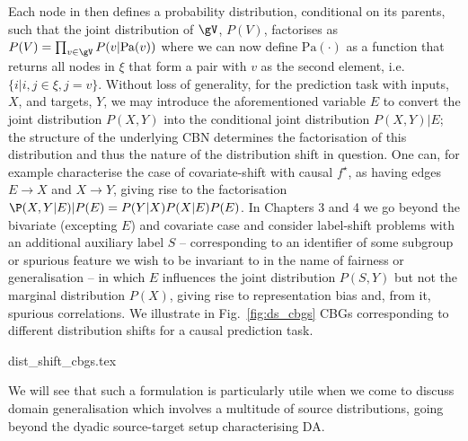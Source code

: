 %
Each node in \rmG then defines a probability distribution, conditional on its parents, such that
the joint distribution of \(\gV\), \(P(V)\), factorises as \( P(V) = \prod_{v \in \gV} P(v |
\text{Pa}(v)) \) where we can now define \(\text{Pa}(\cdot)\) as a function that returns all nodes
in \(\xi\) that form a pair with \(v\) as the second element, i.e. \( \{ i | i,j \in \xi, j = v \}
\).
%
Without loss of generality, for the prediction task with inputs, \(X\), and targets, \(Y\), we may
introduce the aforementioned variable \(E\) to convert the joint distribution \(P(X, Y)\) into the
conditional joint distribution \( P(X, Y) | E \); the structure of the underlying CBN determines
the factorisation of this distribution and thus the nature of the distribution shift in question.
%
One can, for example characterise the case of covariate-shift with causal \(f^\star\), as having
edges  \(E \to X\) and \( X \to Y \), giving rise to the factorisation \( \P(X, Y | E) | P(E) =
P(Y|X)P(X|E)P(E) \). 
%
In Chapters 3 and 4 we go beyond the bivariate (excepting \( E \)) and covariate case and consider
label-shift problems with an additional auxiliary label \(S\) -- corresponding to an identifier of
some subgroup or spurious feature we wish to be invariant to in the name of fairness or
generalisation --  in which \(E\) influences the joint distribution \( P(S, Y) \) but not the
marginal distribution \(P(X)\), giving rise to representation bias and, from it, spurious
correlations.
%
We illustrate in Fig.~\ref{fig:ds_cbgs} CBGs corresponding to different distribution shifts for a
causal prediction task.
%

{dist_shift_cbgs.tex}

%
We will see that such a formulation is particularly utile when we come to discuss domain
generalisation which involves a multitude of source distributions, going beyond the dyadic
source-target setup characterising DA.


